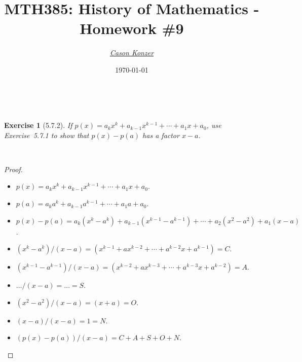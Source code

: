 \documentclass[12pt]{article}
\newcommand{\XB}{\color{black}}
\newcommand{\XBB}{\color{blue}}
\newcommand{\XV}{\color{violet}}
\newcommand{\ds}{\displaystyle}
\theoremstyle{plain}
\newtheorem{ex}{Exercise}
\begin{document}
\title{\textbf{MTH385}: History of Mathematics - Homework \#9}
\date{\today}
\author{\XV\textit{\large{\href{https://github.com/casonk}{Cason Konzer}}}\XB}

\maketitle

\hrulefill

\newpage


\XBB\hrulefill\XB \\
\begin{ex} [5.7.2]
  If $ p(x) = a_{k}x^{k} + a_{k - 1}x^{k - 1} + \cdots + a_{1}x + a_{0} $, use Exercise~5.7.1 to show that $ p(x) - p(a) $ has a factor $ x - a $.
\end{ex}
\XBB\hrulefill\XB \\

\begin{proof}
  \ \\

  \begin{itemize}
    \item $ \ds p(x) = a_{k}x^{k} + a_{k - 1}x^{k - 1} + \cdots + a_{1}x + a_{0} $.
    \item $ \ds p(a) = a_{k}a^{k} + a_{k - 1}a^{k - 1} + \cdots + a_{1}a + a_{0} $.
    \item $ \ds p(x) - p(a) = a_{k}(x^{k} - a^{k}) + a_{k - 1}(x^{k - 1} - a^{k - 1}) + \cdots + a_{2}(x^{2} - a^{2}) + a_{1}(x - a) $.
  \end{itemize}

  \begin{itemize}
    \item $ \ds (x^{k} - a^{k}) / (x - a) =  (x^{k - 1} + ax^{k - 2} + \cdots + a^{k - 2}x + a^{k - 1}) = C $.
    \item $ \ds (x^{k - 1} - a^{k - 1}) / (x - a) = (x^{k - 2} + ax^{k - 3} + \cdots + a^{k - 3}x + a^{k - 2}) = A $.
    \item $ \ds  \dots / (x - a) = \dots = S $.
    \item $ \ds (x^{2} - a^{2}) / (x - a) = (x + a) = O $.
    \item $ \ds (x - a) / (x - a) = 1 = N$.
  \end{itemize}

  \begin{itemize}
    \item $ \ds (p(x) - p(a)) / (x - a) = C + A + S + O + N $.
  \end{itemize}

\end{proof}
\end{document}
